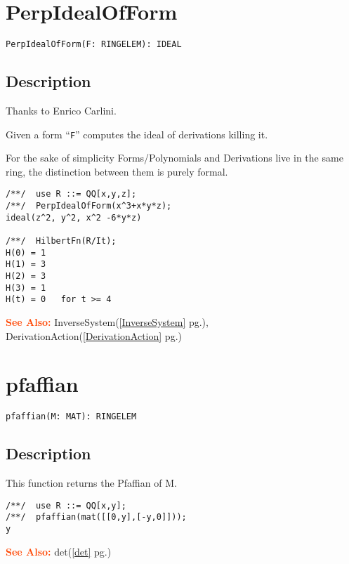 \documentclass[a4paper]{mybook}
\newenvironment{command}{}{} %
\newcommand\SeeAlso{\par\textcolor{OrangeRed}{\textbf{\large See Also: }}}
\begin{document}
\section{PerpIdealOfForm}
\label{PerpIdealOfForm}
\begin{command} %


\begin{Verbatim}[label=syntax, rulecolor=\color{MidnightBlue},
frame=single]
PerpIdealOfForm(F: RINGELEM): IDEAL
\end{Verbatim}


\subsection*{Description}

Thanks to Enrico Carlini.
\par 
Given a form ``\verb&F&'' computes the ideal of derivations killing it.
\par 
For the sake of simplicity Forms/Polynomials and Derivations live in
the same ring, the distinction between them is purely formal.
\begin{Verbatim}[label=example, rulecolor=\color{PineGreen}, frame=single]
/**/  use R ::= QQ[x,y,z];
/**/  PerpIdealOfForm(x^3+x*y*z);
ideal(z^2, y^2, x^2 -6*y*z)

/**/  HilbertFn(R/It);
H(0) = 1
H(1) = 3
H(2) = 3
H(3) = 1
H(t) = 0   for t >= 4
\end{Verbatim}


\SeeAlso %
  InverseSystem(\ref{InverseSystem} pg.\pageref{InverseSystem}), 
    DerivationAction(\ref{DerivationAction} pg.\pageref{DerivationAction})
\end{command} %

\section{pfaffian}
\label{pfaffian}
\begin{command} %


\begin{Verbatim}[label=syntax, rulecolor=\color{MidnightBlue},
frame=single]
pfaffian(M: MAT): RINGELEM
\end{Verbatim}


\subsection*{Description}

This function returns the Pfaffian of M.
\begin{Verbatim}[label=example, rulecolor=\color{PineGreen}, frame=single]
/**/  use R ::= QQ[x,y];
/**/  pfaffian(mat([[0,y],[-y,0]]));
y
\end{Verbatim}


\SeeAlso %
  det(\ref{det} pg.\pageref{det})
\end{command} %
\end{document}
